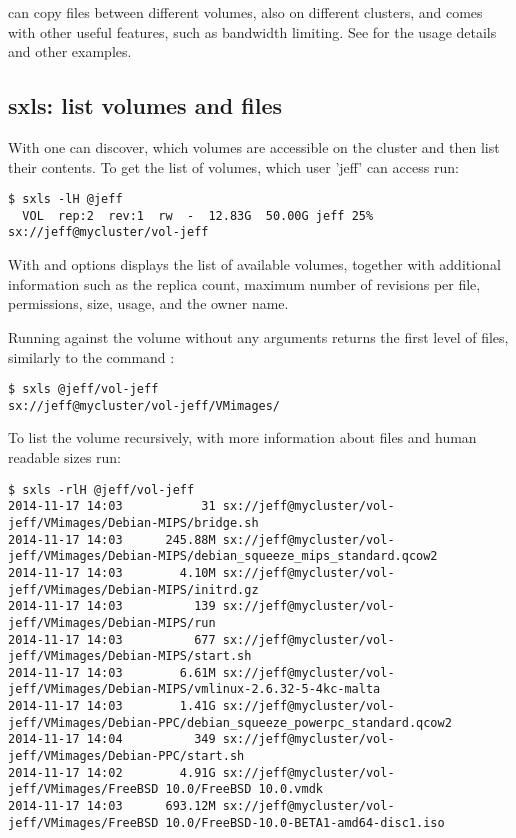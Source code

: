  can copy files between different volumes, also on different
clusters, and comes with other useful features, such as bandwidth limiting. See
 for the usage details and other examples.

\subsection{sxls: list volumes and files}
With  one can discover, which volumes are accessible on the cluster
and then list their contents. To get the list of volumes, which user 'jeff'
can access run:
\begin{lstlisting}
$ sxls -lH @jeff
  VOL  rep:2  rev:1  rw  -  12.83G  50.00G jeff 25% sx://jeff@mycluster/vol-jeff
\end{lstlisting}
With  and  options 
displays the list of available volumes, together with additional information
such as the replica count, maximum number of revisions per file, permissions,
size, usage, and the owner name.

Running  against the volume without any arguments returns the first
level of files, similarly to the command :
\begin{lstlisting}
$ sxls @jeff/vol-jeff
sx://jeff@mycluster/vol-jeff/VMimages/
\end{lstlisting}
To list the volume recursively, with more information about files and human
readable sizes run:
\begin{lstlisting}
$ sxls -rlH @jeff/vol-jeff
2014-11-17 14:03           31 sx://jeff@mycluster/vol-jeff/VMimages/Debian-MIPS/bridge.sh
2014-11-17 14:03      245.88M sx://jeff@mycluster/vol-jeff/VMimages/Debian-MIPS/debian_squeeze_mips_standard.qcow2
2014-11-17 14:03        4.10M sx://jeff@mycluster/vol-jeff/VMimages/Debian-MIPS/initrd.gz
2014-11-17 14:03          139 sx://jeff@mycluster/vol-jeff/VMimages/Debian-MIPS/run
2014-11-17 14:03          677 sx://jeff@mycluster/vol-jeff/VMimages/Debian-MIPS/start.sh
2014-11-17 14:03        6.61M sx://jeff@mycluster/vol-jeff/VMimages/Debian-MIPS/vmlinux-2.6.32-5-4kc-malta
2014-11-17 14:03        1.41G sx://jeff@mycluster/vol-jeff/VMimages/Debian-PPC/debian_squeeze_powerpc_standard.qcow2
2014-11-17 14:04          349 sx://jeff@mycluster/vol-jeff/VMimages/Debian-PPC/start.sh
2014-11-17 14:02        4.91G sx://jeff@mycluster/vol-jeff/VMimages/FreeBSD 10.0/FreeBSD 10.0.vmdk
2014-11-17 14:03      693.12M sx://jeff@mycluster/vol-jeff/VMimages/FreeBSD 10.0/FreeBSD-10.0-BETA1-amd64-disc1.iso
\end{lstlisting}

